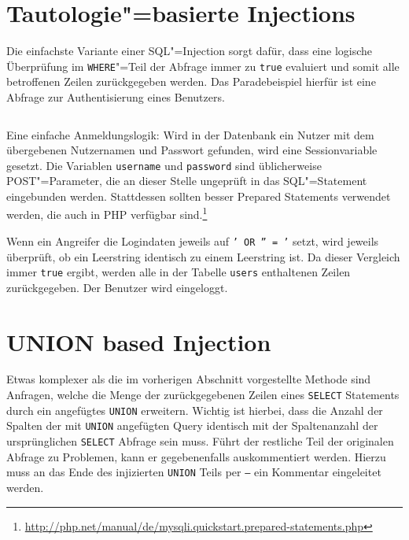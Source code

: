 \section{Tautologie"=basierte Injections}

Die einfachste Variante einer SQL"=Injection sorgt dafür, dass eine logische Überprüfung im \texttt{WHERE}"=Teil der Abfrage immer zu \texttt{true} evaluiert und somit alle betroffenen Zeilen zurückgegeben werden. Das Paradebeispiel hierfür ist eine Abfrage zur Authentisierung eines Benutzers.


\begin{listing}
\begin{margincap}
\inputminted[startinline]{php}{imports/login_1.php}
\caption[login]{Eine einfache Anmeldungslogik: Wird in der Datenbank ein Nutzer mit dem übergebenen Nutzernamen und Passwort gefunden, wird eine Sessionvariable gesetzt. Die Variablen \texttt{username} und \texttt{password} sind üblicherweise POST"=Parameter, die an dieser Stelle ungeprüft in das SQL"=Statement eingebunden werden. Stattdessen sollten besser Prepared Statements verwendet werden, die auch in PHP verfügbar sind.\footnote{\url{http://php.net/manual/de/mysqli.quickstart.prepared-statements.php}} }
\label{lst:login_query}
\end{margincap}
\end{listing}

Wenn ein Angreifer die Logindaten jeweils auf \texttt{' OR '' = '} setzt, wird jeweils überprüft, ob ein Leerstring identisch zu einem Leerstring ist. Da dieser Vergleich immer \texttt{true} ergibt, werden alle in der Tabelle \texttt{users} enthaltenen Zeilen zurückgegeben. Der Benutzer wird eingeloggt.

\section{UNION based Injection}

Etwas komplexer als die im vorherigen Abschnitt vorgestellte Methode sind Anfragen, welche die Menge der zurückgegebenen Zeilen eines \texttt{SELECT} Statements durch ein angefügtes \texttt{UNION} erweitern. Wichtig ist hierbei, dass die Anzahl der Spalten der mit \texttt{UNION} angefügten Query identisch mit der Spaltenanzahl der ursprünglichen  \texttt{SELECT} Abfrage sein muss. Führt der restliche Teil der originalen Abfrage zu Problemen, kann er gegebenenfalls auskommentiert werden. Hierzu muss an das Ende des injizierten \texttt{UNION} Teils per \texttt{--} ein Kommentar eingeleitet werden.


